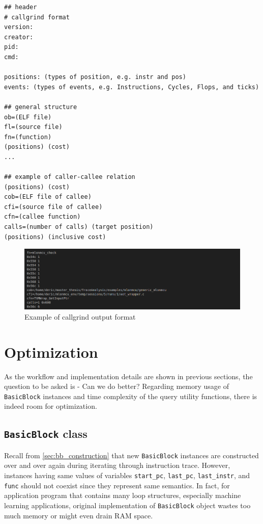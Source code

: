\begin{center}
\begin{minipage}{\textwidth}
\begin{lstlisting}
## header
# callgrind format
version:
creator:
pid:
cmd:

positions: (types of position, e.g. instr and pos)
events: (types of events, e.g. Instructions, Cycles, Flops, and ticks)

## general structure
ob=(ELF file)
fl=(source file)
fn=(function)
(positions) (cost)
...

## example of caller-callee relation
(positions) (cost)
cob=(ELF file of callee)
cfi=(source file of callee)
cfn=(callee function)
calls=(number of calls) (target position)
(positions) (inclusive cost)
\end{lstlisting}
\end{minipage}
\end{center}

\begin{figure}
    \centering
    \includegraphics[width=\linewidth]{figures/Output_format_example.png}
    \caption{Example of callgrind output format}
    \label{fig:callgrind_output_format}
\end{figure}

\section{Optimization}
As the workflow and implementation details are shown in previous sections, the question to be asked is - Can we do better? Regarding memory usage of \texttt{BasicBlock} instances and time complexity of the query utility functions, there is indeed room for optimization. 

\subsection{\texttt{BasicBlock} class}
\label{sec:basicblock_optimization}

Recall from \cref{sec:bb_construction} that new \texttt{BasicBlock} instances are constructed over and over again during iterating through instruction trace. However, instances having same values of variables \texttt{start\_pc}, \texttt{last\_pc}, \texttt{last\_instr}, and \texttt{func} should not coexist since they represent same semantics. In fact, for application program that contains many loop structures, especially machine learning applications, original implementation of \texttt{BasicBlock} object wastes too much memory or might even drain RAM space.

